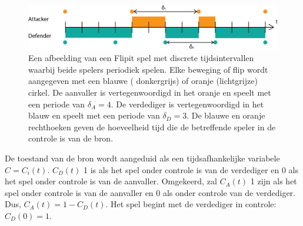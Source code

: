\documentclass[master=cws, masteroption=vs]{kulemt}
\begin{document}
\begin{abstract*}
\begin{figure}[hbtp]
\center
\includegraphics[scale=0.5]{../../doc/template/Images/DefFlipit}
\caption{Een afbeelding van een Flipit spel met discrete tijdsintervallen waarbij beide spelers periodiek spelen. Elke beweging of flip wordt aangegeven met een blauwe ( donkergrijs) of oranje (lichtgrijze) cirkel. De aanvaller is vertegenwoordigd in het oranje en speelt met een periode van $ \delta_{A} = 4 $. De verdediger is vertegenwoordigd in het blauw en speelt met een periode van $ \delta_{D} = 3 $. De blauwe en oranje rechthoeken geven de hoeveelheid tijd die de betreffende speler in de controle is van de bron.}
\label{fig: FLipItDefault}
\end{figure}



De toestand van de bron wordt aangeduid als een tijdsafhankelijke variabele $ C = C_{i}(t) $.
$ C_{D}(t) $ 1 is als het spel onder controle is van de verdediger en 0 als het spel onder controle is van de aanvaller. Omgekeerd, zal $ C_{A}(t) $ 1 zijn als het spel onder controle is van de aanvaller en 0 als onder controle van de verdediger. Dus, $ C_{A}(t) = 1 - C_{D}(t) $.
Het spel begint met de verdediger in controle: $ C_{D}(0) = 1 $. \\



\end{abstract*}
\end{document}
